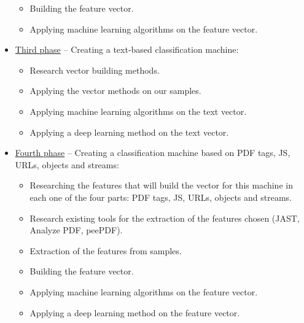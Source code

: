 \documentclass[10pt, a4paper]{article}
\begin{document}
\begin{itemize}
\begin{itemize}
	\item Building the feature vector.
	\item Applying machine learning algorithms on the feature vector.
	\end{itemize}
\item \underline{Third phase} – Creating a text-based classification machine:
	\begin{itemize}
	\item Research vector building methods.
	\item Applying the vector methods on our samples.
	\item Applying machine learning algorithms on the text vector.
	\item Applying a deep learning method on the text vector.
	\end{itemize}
\item \underline{Fourth phase} – Creating a classification machine based on PDF tags, JS, URLs, objects and streams:
	\begin{itemize}
	\item Researching the features that will build the vector for this machine in each one of the four parts: PDF tags, JS, URLs, objects and streams.
	\item Research existing tools for the extraction of the features chosen (JAST, Analyze PDF, peePDF).
	\item Extraction of the features from samples.
	\item Building the feature vector.
	\item Applying machine learning algorithms on the feature vector.
	\item Applying a deep learning method on the feature vector.
	\end{itemize}
\end{itemize}


\newpage
\end{document}
